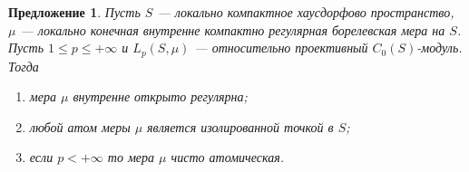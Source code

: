 \documentclass[12pt]{article}
\newtheorem{proposition}[theorem]{Предложение}
\begin{document}
\begin{proposition}\label{LpC0ModNecessCond}  Пусть $S$ --- локально компактное
    хаусдорфово пространство, $\mu$ --- локально конечная внутренне компактно
    регулярная борелевская мера на $S$. Пусть $1\leq p\leq +\infty$ и
    $L_p(S,\mu)$ --- относительно проективный $C_0(S)$-модуль. Тогда
    \begin{enumerate}[label = (\roman*)]
        \item мера $\mu$ внутренне открыто регулярна;

        \item любой атом меры $\mu$ является изолированной точкой в $S$;

        \item если $p<+\infty$ то мера $\mu$ чисто атомическая.
    \end{enumerate}
\end{proposition}
\end{document}
